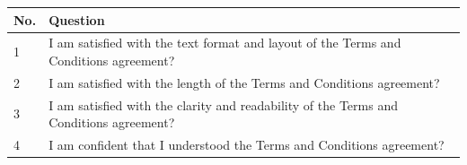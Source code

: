 \documentclass{standalone}
\begin{document}
	\begin{tabular}{|l|l|}
		\hline
		No. & Question\\
		\hline
		1 & I am satisfied with the text format and layout of the Terms and Conditions agreement?\\
		\hline
		2 & I am satisfied with the length of the Terms and Conditions agreement?\\
		\hline
		3 & I am satisfied with the clarity and readability of the Terms and Conditions agreement?\\
		\hline
		4 & I am confident that I understood the Terms and Conditions agreement?\\
		\hline
	\end{tabular}
	
\end{document}
